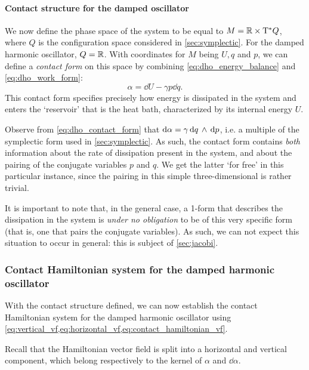 \paragraph{Contact structure for the damped oscillator} We now define the phase space of the system to be equal to \(M = \mathbb{R} \times \mathrm{T}^*Q\), where \(Q\) is the configuration space considered in \cref{sec:symplectic}. For the damped harmonic oscillator, \(Q = \mathbb{R}\). With coordinates for \(M\) being \(U, q\) and \(p\), we can define a \emph{contact form} on this space by combining \cref{eq:dho_energy_balance} and \cref{eq:dho_work_form}: 
\begin{equation}
    \alpha = \dd{U} - \gamma p \dd{q}.
    \label{eq:dho_contact_form}
\end{equation}
This contact form specifies precisely how energy is dissipated in the system and enters the `reservoir' that is the heat bath, characterized by its internal energy \(U\).

Observe from \cref{eq:dho_contact_form} that \(\dd{\alpha} = \gamma  \dd{q}\,\wedge\,\dd{p} \), i.e. a multiple of the symplectic form used in \cref{sec:symplectic}. As such, the contact form contains \emph{both} information about the rate of dissipation present in the system, and about the pairing of the conjugate variables \(p\) and \(q\). We get the latter `for free' in this particular instance, since the pairing in this simple three-dimensional is rather trivial.

It is important to note that, in the general case, a 1-form that describes the dissipation in the system is \emph{under no obligation} to be of this very specific form (that is, one that pairs the conjugate variables). As such, we can not expect this situation to occur in general: this is subject of \cref{sec:jacobi}.

\subsubsection{Contact Hamiltonian system for the damped harmonic oscillator}
With the contact structure defined, we can now establish the contact Hamiltonian system for the damped harmonic oscillator using \cref{eq:vertical_vf,eq:horizontal_vf,eq:contact_hamiltonian_vf}.

Recall that the Hamiltonian vector field is split into a horizontal and vertical component, which belong respectively to the kernel of \(\alpha\) and \(\dd{\alpha}\).

